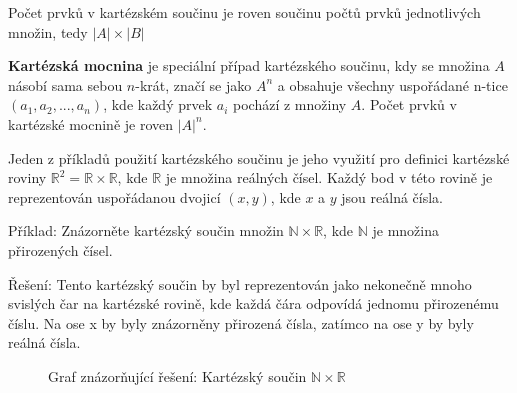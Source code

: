 \documentclass[12pt]{article}
\begin{document}
Počet prvků v kartézském součinu je roven součinu počtů prvků jednotlivých množin, tedy $|A| \times |B|$

\textbf{Kartézská mocnina} je speciální případ kartézského součinu, kdy se množina $A$ násobí sama sebou $n$-krát, značí se jako \textbf{$A^n$} a obsahuje všechny uspořádané n-tice $(a_1, a_2, ..., a_n)$, kde každý prvek $a_i$ pochází z množiny $A$. Počet prvků v kartézské mocnině je roven $|A|^n$.

Jeden z příkladů použití kartézského součinu je jeho využití pro definici kartézské roviny $\mathbb{R}^2 = \mathbb{R} \times \mathbb{R}$, kde $\mathbb{R}$ je množina reálných čísel. Každý bod v této rovině je reprezentován uspořádanou dvojicí $(x, y)$, kde $x$ a $y$ jsou reálná čísla.

Příklad: Znázorněte kartézský součin množin $\mathbb{N} \times \mathbb{R}$, kde $\mathbb{N}$ je množina přirozených čísel. 

Řešení: Tento kartézský součin by byl reprezentován jako nekonečně mnoho svislých čar na kartézské rovině, kde každá čára odpovídá jednomu přirozenému číslu. Na ose x by byly znázorněny přirozená čísla, zatímco na ose y by byly reálná čísla. 

\begin{figure}[H]
    \centering
    \caption*{Graf znázorňující řešení: Kartézský součin $\mathbb{N} \times \mathbb{R}$}
\end{figure}
\end{document}
